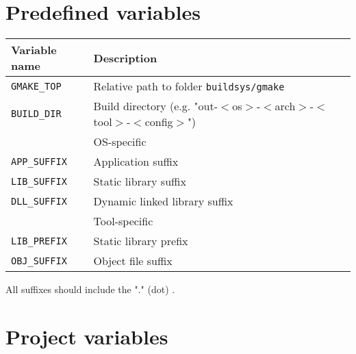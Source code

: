\documentclass{article}
\newcommand{\var}[1]{{\tt #1}}
\newcommand{\file}[1]{{\tt #1}}
\begin{document}
\section{Predefined variables}

\begin{tabular}{ll}
Variable name		& Description		\\
\hline
\var{GMAKE\_TOP}	& Relative path to folder \file{buildsys/gmake} \\
\var{BUILD\_DIR}	& Build directory (e.g. "out-$<$os$>$-$<$arch$>$-$<$tool$>$-$<$config$>$")\\
\hline
& OS-specific \\
\hline
\var{APP\_SUFFIX} & Application suffix            \\
\var{LIB\_SUFFIX} & Static library suffix         \\
\var{DLL\_SUFFIX} & Dynamic linked library suffix \\
\hline
& Tool-specific \\
\hline
\var{LIB\_PREFIX} & Static library prefix         \\
\var{OBJ\_SUFFIX} & Object file suffix            \\
\end{tabular}

All suffixes should include the "." (dot) .

\section{Project variables}
\end{document}
